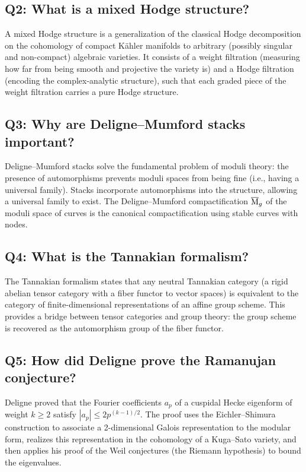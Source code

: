 \subsection*{Q2: What is a mixed Hodge structure?}

A mixed Hodge structure is a generalization of the classical Hodge decomposition on the cohomology of compact K\"ahler manifolds to arbitrary (possibly singular and non-compact) algebraic varieties. It consists of a weight filtration (measuring how far from being smooth and projective the variety is) and a Hodge filtration (encoding the complex-analytic structure), such that each graded piece of the weight filtration carries a pure Hodge structure.

\subsection*{Q3: Why are Deligne--Mumford stacks important?}

Deligne--Mumford stacks solve the fundamental problem of moduli theory: the presence of automorphisms prevents moduli spaces from being fine (i.e., having a universal family). Stacks incorporate automorphisms into the structure, allowing a universal family to exist. The Deligne--Mumford compactification \(\overline{\operatorname{M}}_g\) of the moduli space of curves is the canonical compactification using stable curves with nodes.

\subsection*{Q4: What is the Tannakian formalism?}

The Tannakian formalism states that any neutral Tannakian category (a rigid abelian tensor category with a fiber functor to vector spaces) is equivalent to the category of finite-dimensional representations of an affine group scheme. This provides a bridge between tensor categories and group theory: the group scheme is recovered as the automorphism group of the fiber functor.

\subsection*{Q5: How did Deligne prove the Ramanujan conjecture?}

Deligne proved that the Fourier coefficients \(a_p\) of a cuspidal Hecke eigenform of weight \(k \geq 2\) satisfy \(|a_p| \leq 2 p^{(k-1)/2}\). The proof uses the Eichler--Shimura construction to associate a 2-dimensional Galois representation to the modular form, realizes this representation in the cohomology of a Kuga--Sato variety, and then applies his proof of the Weil conjectures (the Riemann hypothesis) to bound the eigenvalues.

